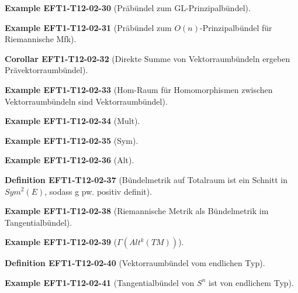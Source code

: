 \documentclass[10pt, letterpaper]{article}
\newcommand{\CustomHeading}[3]{%
  \par\medskip\noindent%
  \textbf{#1 #2} \textnormal{(#3)}.\enskip%
}
\newenvironment{DEF}[2]{\CustomHeading{Definition}{#1}{#2}}{}
\newenvironment{KORO}[2]{\CustomHeading{Corollar}{#1}{#2}}{}
\newenvironment{EXA}[2]{\CustomHeading{Example}{#1}{#2}}{}
\begin{document}
\begin{EXA}{EFT1-T12-02-30}{Präbündel zum GL-Prinzipalbündel}
\end{EXA}

\begin{EXA}{EFT1-T12-02-31}{Präbündel zum $O(n)$-Prinzipalbündel für Riemannische Mfk}
\end{EXA}

\begin{KORO}{EFT1-T12-02-32}{Direkte Summe von Vektorraumbündeln ergeben Prävektorraumbündel}
\end{KORO}

\begin{EXA}{EFT1-T12-02-33}{Hom-Raum für Homomorphismen zwischen Vektorraumbündeln sind Vektorraumbündel}
\end{EXA}

\begin{EXA}{EFT1-T12-02-34}{Mult}
\end{EXA}

\begin{EXA}{EFT1-T12-02-35}{Sym}
\end{EXA}

\begin{EXA}{EFT1-T12-02-36}{Alt}
\end{EXA}

\begin{DEF}{EFT1-T12-02-37}{Bündelmetrik auf Totalraum ist ein Schnitt in $Sym^2(E)$, sodass g pw. positiv definit}
\end{DEF}

\begin{EXA}{EFT1-T12-02-38}{Riemannische Metrik als Bündelmetrik im Tangentialbündel}
\end{EXA}

\begin{EXA}{EFT1-T12-02-39}{$\Gamma (Alt^k(TM))$}
\end{EXA}

\begin{DEF}{EFT1-T12-02-40}{Vektorraumbündel vom endlichen Typ}
\end{DEF}

\begin{EXA}{EFT1-T12-02-41}{Tangentialbündel von $S^n$ ist von endlichem Typ}
\end{EXA}
\end{document}
